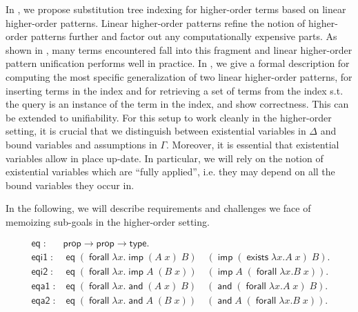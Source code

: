 \documentclass{acmconf}
\newcommand{\typeLF}{\textsf{type}}
\newcommand{\propLF}{\textsf{prop}}
\newcommand{\andLF}{\; \textsf{and}\;}
\newcommand{\impLF}{\;\textsf{imp}\;}
\newcommand{\forallLF}{\;\textsf{forall}\;}
\newcommand{\existsLF}{\;\textsf{exists}\;}
\newcommand{\eqLF}{\;\textsf{eq}\;}
\newcommand{\eqilLF}{\;\textsf{eqi1}\;}
\newcommand{\eqirLF}{\;\textsf{eqi2}\;}
\newcommand{\eqalLF}{\;\textsf{eqa1}\;}
\newcommand{\eqarLF}{\;\textsf{eqa2}\;}
\begin{document}
In \cite{Pientka:ICLP02}, we propose substitution tree indexing for
higher-order terms based on linear higher-order patterns. Linear
higher-order patterns refine the notion of higher-order patterns
further and factor out any computationally expensive parts. As shown
in \cite{PientkaPfenning:CADE03}, many terms encountered fall into
this fragment and linear higher-order pattern unification performs well in
practice. In \cite{Pientka:ICLP02,Pientka:Phd}, we give a formal
description for computing the most specific generalization of two
linear higher-order patterns, for inserting terms in the index and for
retrieving a set of terms from the index s.t. the query is an instance
of the term in the index, and show correctness. This can be extended
to unifiability. For this setup to work cleanly in the higher-order
setting, it is crucial that we distinguish between existential
variables in $\Delta$ and bound variables and assumptions in
$\Gamma$. Moreover, it is essential that existential variables allow
in place up-date. In particular, we will rely on the notion of
existential variables which are ``fully applied'', i.e. they may
depend on all the bound variables they occur in.

 In the following, we will describe requirements and
challenges we face of memoizing sub-goals in the higher-order setting. 


\[
\begin{array}{ll}
\eqLF: & \propLF \rightarrow \propLF \rightarrow \typeLF.\\[1em]
%
\eqilLF: & \eqLF (\forallLF \lambda x. \impLF (A\; x)\; B)\quad (\impLF (\existsLF \lambda x. A\; x)\; B).\\
\eqirLF: & \eqLF (\forallLF \lambda x. \impLF A \; (B\; x)) \quad (\impLF A\; (\forallLF \lambda x. B\;x)).\\
\eqalLF: & \eqLF (\forallLF \lambda x. \andLF (A\; x)\; B) \quad (\andLF (\forallLF \lambda x. A \;x) \; B).\\
\eqarLF: & \eqLF (\forallLF \lambda x. \andLF A \; (B\;x)) \quad (\andLF A \; (\forallLF \lambda x. B\; x)).\\
\end{array}
\]
\end{document}
